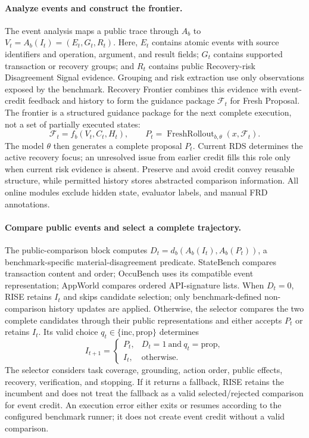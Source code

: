 \documentclass{article}
\begin{document}
\paragraph{Analyze events and construct the frontier.}
The event analysis maps a public trace through $A_b$ to $V_t=A_b(I_t)=(E_t,G_t,R_t)$. Here, $E_t$ contains atomic events with source identifiers and operation, argument, and result fields; $G_t$ contains supported transaction or recovery groups; and $R_t$ contains public Recovery-risk Disagreement Signal evidence. Grouping and risk extraction use only observations exposed by the benchmark. Recovery Frontier combines this evidence with event-credit feedback and history to form the guidance package $\mathcal{F}_t$ for Fresh Proposal. The frontier is a structured guidance package for the next complete execution, not a set of partially executed states:
\begin{equation}
\mathcal{F}_t=f_b(V_t,C_t,H_t),\qquad
P_t=\operatorname{FreshRollout}_{b,\theta}(x,\mathcal{F}_t).
\label{eq:frontier}
\end{equation}
The model $\theta$ then generates a complete proposal $P_t$. Current RDS determines the active recovery focus; an unresolved issue from earlier credit fills this role only when current risk evidence is absent. Preserve and avoid credit convey reusable structure, while permitted history stores abstracted comparison information. All online modules exclude hidden state, evaluator labels, and manual FRD annotations.

\paragraph{Compare public events and select a complete trajectory.}
The public-comparison block computes $D_t=d_b(A_b(I_t),A_b(P_t))$, a benchmark-specific material-disagreement predicate. StateBench compares transaction content and order; OccuBench uses its compatible event representation; AppWorld compares ordered API-signature lists. When $D_t=0$, RISE retains $I_t$ and skips candidate selection; only benchmark-defined non-comparison history updates are applied. Otherwise, the selector compares the two complete candidates through their public representations and either accepts $P_t$ or retains $I_t$. Its valid choice $q_t\in\{\mathrm{inc},\mathrm{prop}\}$ determines
\begin{equation}
I_{t+1}=\begin{cases}P_t,&D_t=1\ \text{and}\ q_t=\mathrm{prop},\\
I_t,&\text{otherwise}.\end{cases}
\label{eq:incumbent}
\end{equation}
The selector considers task coverage, grounding, action order, public effects, recovery, verification, and stopping. If it returns a fallback, RISE retains the incumbent and does not treat the fallback as a valid selected/rejected comparison for event credit. An execution error either exits or resumes according to the configured benchmark runner; it does not create event credit without a valid comparison.
\end{document}
